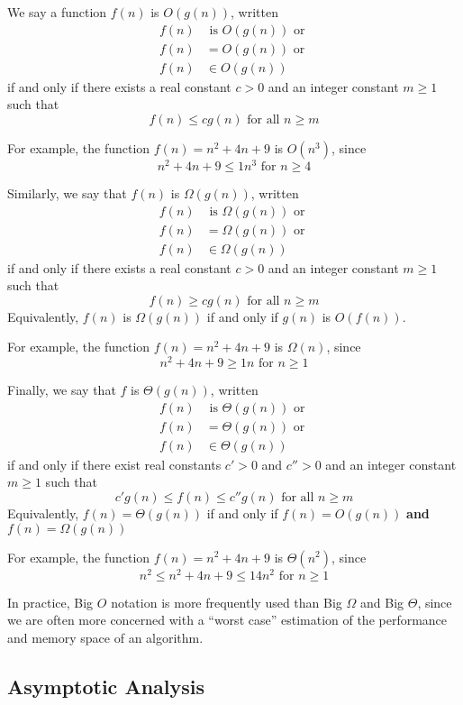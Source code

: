 \documentclass[a4paper]{article}
\begin{document}
We say a function $f(n)$ is $O(g(n))$, written \begin{align*}f(n) &\text{ is } O(g(n))\text{ or }\\f(n)&=O(g(n))\text{ or }\\f(n)&\in O(g(n))\end{align*} if and only if there exists a real constant $c>0$ and an integer constant $m\geq1$ such that \[f(n)\leq cg(n) \text{ for all }n\geq m\]

For example, the function $f(n)=n^2+4n+9$ is $O(n^3)$, since \[n^2+4n+9\leq 1n^3\text{ for } n\geq4\]

Similarly, we say that $f(n)$ is $\Omega(g(n))$, written \begin{align*}f(n) &\text{ is } \Omega(g(n))\text{ or }\\f(n)&=\Omega(g(n))\text{ or }\\f(n)&\in \Omega(g(n))\end{align*} if and only if there exists a real constant $c>0$ and an integer constant $m\geq1$ such that \[f(n)\geq cg(n) \text{ for all }n\geq m\] Equivalently, $f(n)$ is $\Omega(g(n))$ if and only if $g(n)$ is $O(f(n))$. 

For example, the function $f(n)=n^2+4n+9$ is $\Omega(n)$, since \[n^2+4n+9\geq 1n\text{ for }n\geq1\]

Finally, we say that $f$ is $\Theta(g(n))$, written \begin{align*}f(n) &\text{ is } \Theta(g(n))\text{ or }\\f(n)&=\Theta(g(n))\text{ or }\\f(n)&\in \Theta(g(n))\end{align*} if and only if there exist real constants $c'>0$ and $c''>0$ and an integer constant $m\geq1$ such that \[c'g(n) \leq f(n)\leq c''g(n) \text{ for all }n\geq m\] Equivalently, $f(n)=\Theta(g(n))$ if and only if $f(n)=O(g(n))$ \textbf{and} $f(n)=\Omega(g(n))$

For example, the function $f(n)=n^2+4n+9$ is $\Theta(n^2)$, since \[n^2 \leq n^2+4n+9\leq14n^2\text{ for } n\geq1\]

In practice, Big $O$ notation is more frequently used than Big $\Omega$ and Big $\Theta$, since we are often more concerned with a ``worst case'' estimation of the performance and memory space of an algorithm.

\subsection{Asymptotic Analysis}
\end{document}
